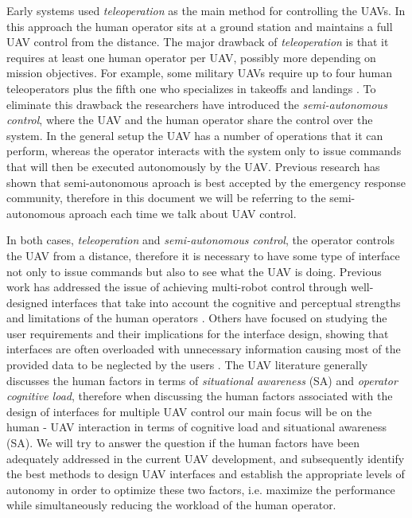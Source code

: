 \documentclass[12pt, letterpaper, oneside]{article}
\begin{document}
Early systems used \emph{teleoperation} as the main method for controlling the UAVs. In this approach the human operator sits at a ground station and maintains a full UAV control from the distance. The major drawback of \emph{teleoperation} is that it requires at least one human operator per UAV, possibly more depending on mission objectives. For example, some military UAVs require up to four human teleoperators plus the fifth one who specializes in takeoffs and landings \cite{33}. To eliminate this drawback the researchers have introduced the \emph{semi-autonomous control}, where the UAV and the human operator share the control over the system. In the general setup the UAV has a number of operations that it can perform, whereas the operator interacts with the system only to issue commands that will then be executed autonomously by the UAV. Previous research has shown that semi-autonomous aproach is best accepted by the emergency response community, therefore in this document we will be referring to the semi-autonomous aproach each time we talk about UAV control.    

In both cases, \emph{teleoperation} and \emph{semi-autonomous control}, the operator controls the UAV from a distance, therefore it is necessary to have some type of interface not only to issue commands but also to see what the UAV is doing. Previous work has addressed the issue of achieving multi-robot control through well-designed interfaces that take into account the cognitive and perceptual strengths and limitations of the human operators \cite{11, 25}. Others have focused on studying the user requirements and their implications for the interface design, showing that interfaces are often overloaded with unnecessary information causing most of the provided data to be neglected by the users \cite{7, 22}. The UAV literature generally discusses the human factors in terms of \emph{situational awareness} (SA) and \emph{operator cognitive load}, therefore when discussing the human factors associated with the design of interfaces for multiple UAV control our main focus will be on the human - UAV interaction in terms of cognitive load and situational awareness (SA). We will try to answer the question if the human factors have been adequately addressed in the current UAV development, and subsequently identify the best methods to design UAV interfaces and establish the appropriate levels of autonomy in order to optimize these two factors, i.e. maximize the performance while simultaneously reducing the workload of the human operator.   
\end{document}
